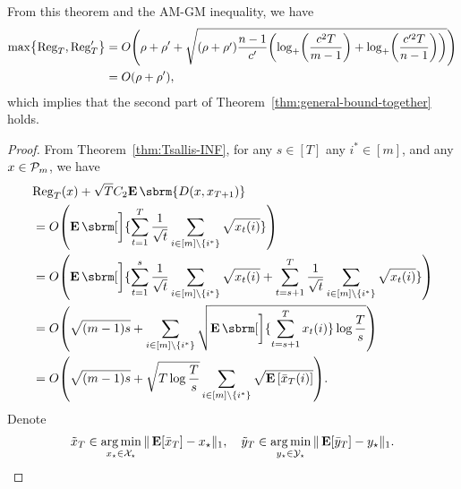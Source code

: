 From this theorem and the AM-GM inequality,
we have
\begin{align*}
    \max\mleft\{
        \Rr_T,
        \Rc_T
    \mright\}
    &
    =
    O\mleft(
        \rhor
        +
        \rhoc + \sqrt{(\rhor + \rhoc)\frac{n-1}{c'} 
        \mleft( 
            \log_+ \mleft(\frac{c^2T}{m-1} \mright)
            +
            \log_+ \mleft(\frac{c'^2T}{n-1} \mright)
        \mright)
        }
    \mright)
    \\
    &
    =
    O\mleft(
        \rhor + \rhoc
    \mright),
\end{align*}
which implies that the second part of Theorem~\ref{thm:general-bound-together} holds.
\begin{proof}
From Theorem~\ref{thm:Tsallis-INF},
for any $s \in [T]$ any $i^* \in [m]$,
and any $x \in \mathcal{P}_m$,
we have
\begin{align}
    &
    \nonumber
    \Rr_T(x)
    +
    \sqrt{T}\constd{\E\sbrm{
        D(x, x_{T+1})
    }}
    \\
    &
    \nonumber
    =
    O\rbr{
        \E\sbrm[\bigg]{
        \sum_{t=1}^T
        \frac{1}{\sqrt{t}}
        \sum_{i \in [m] \setminus \{ i^* \}}
        \sqrt{x_t(i)}
        }
    }
    \\
    &
    \nonumber
    =
    O\mleft(
        \E\sbrm[\bigg]{
        \sum_{t=1}^s
        \frac{1}{\sqrt{t}}
        \sum_{i \in [m] \setminus \{ i^* \}}
        \sqrt{x_t(i)}
        +
        \sum_{t=s+1}^T
        \frac{1}{\sqrt{t}}
        \sum_{i \in [m] \setminus \{ i^* \}}
        \sqrt{x_t(i)}
        }
    \mright)
    \\
    &
    \nonumber
    =
    O\mleft(
        \sqrt{(m-1)s}
        +
        \sum_{i \in [m] \setminus \{ i^* \}}
        \sqrt{
            \E\sbrm[\bigg]{
            \sum_{t=s+1}^T
            x_t(i)
            }
            \log \frac{T}{s}
        }
    \mright)
    \\
    &
    =
    O\mleft(
        \sqrt{(m-1)s}
        +
        \sqrt{
        T
        \log \frac{T}{s}
        }
        \sum_{i \in [m] \setminus \{ i^* \}}
        \sqrt{
            \E \left[
            \bar{x}_T(i)
            \right]
        }
    \mright).
    \label{eq:Rrmx}
\end{align}
Denote
\begin{align}
    \label{eq:deftildex}
    \tilde{x}_T
    \in
    \operatorname*{arg\,min}_{x_{\star} \in \mathcal{X}_{\star}}\| \operatorname*{\mathbf{E}} [ \bar{x}_T] - x_{\star} \|_1,
    \quad
    \tilde{y}_T
    \in
    \operatorname*{arg\,min}_{y_{\star} \in \mathcal{Y}_{\star}}\| \operatorname*{\mathbf{E}}[\bar{y}_T] - y_{\star} \|_1.
\end{align}

\end{proof}
